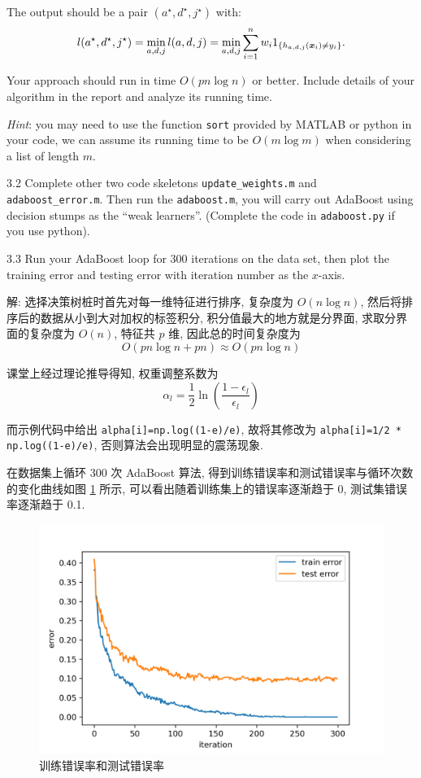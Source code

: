 \documentclass{article}
\begin{document}
The output should be a pair $(a^{\star}, d^{\star}, j^{\star})$ with:
\begin{eqnarray}
l(a^{\star}, d^{\star}, j^{\star})=\min_{a, d, j}l(a, d, j)=\min_{a, d, j}\sum_{i=1}^{n}w_{i}1_{\{h_{a, d, j}(\bm{x}_{i})\neq y_{i}\}}.
\end{eqnarray}

Your approach should run in time $O(pn\log n)$ or better. Include details of your algorithm in the report and analyze its running time.

\emph{Hint}: you may need to use the function \verb|sort| provided by MATLAB or python in your code, we can assume its running time to be $O(m \log m)$ when considering a list of length $m$.

3.2 Complete other two code skeletons \verb|update_weights.m| and \verb|adaboost_error.m|. Then run the \verb|adaboost.m|, you will carry out AdaBoost using decision stumps as the ``weak learners''. (Complete the code in \verb|adaboost.py| if you use python).

3.3 Run your AdaBoost loop for 300 iterations on the data set, then plot the training error and testing error with iteration number as the $x$-axis.

解: 选择决策树桩时首先对每一维特征进行排序, 复杂度为 $O(n\log n)$, 然后将排序后的数据从小到大对加权的标签积分, 积分值最大的地方就是分界面, 求取分界面的复杂度为 $O(n)$, 特征共 $p$ 维, 因此总的时间复杂度为
\begin{equation}
  O(pn\log n+pn)\approx O(pn\log n)
\end{equation}

课堂上经过理论推导得知, 权重调整系数为
\begin{equation}
  \alpha_l=\frac{1}{2}\ln\left(\frac{1-\epsilon_l}{\epsilon_l}\right)
\end{equation}

而示例代码中给出 \verb|alpha[i]=np.log((1-e)/e)|, 故将其修改为 \verb|alpha[i]=1/2 * np.log((1-e)/e)|, 否则算法会出现明显的震荡现象.

在数据集上循环 300 次 AdaBoost 算法, 得到训练错误率和测试错误率与循环次数的变化曲线如图 \ref{fig:error_rate} 所示, 可以看出随着训练集上的错误率逐渐趋于 0, 测试集错误率逐渐趋于 0.1.

\begin{figure}[htbp]
  \centering
  \includegraphics[width=12cm]{error.png}
  \caption{训练错误率和测试错误率}
  \label{fig:error_rate}
\end{figure}
\end{document}
